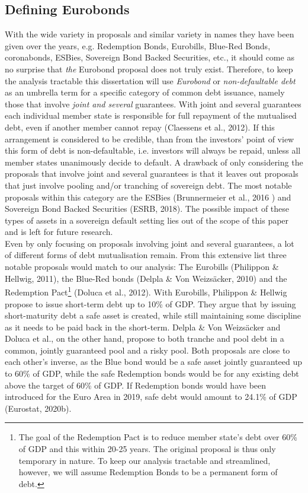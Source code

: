 \subsection{Defining Eurobonds}
With the wide variety in proposals and similar variety in names they have been given over the years, e.g. Redemption Bonds, Eurobills, Blue-Red Bonds, coronabonds, ESBies, Sovereign Bond Backed Securities, etc., it should come as no surprise that \textit{the} Eurobond proposal does not truly exist. Therefore, to keep the analysis tractable this dissertation will use \textit{Eurobond} or \textit{non-defaultable debt} as an umbrella term for a specific category of common debt issuance, namely those that involve \textit{joint and several} guarantees. With joint and several guarantees each individual member state is responsible for full repayment of the mutualised debt, even if another member cannot repay (Claessens et al., 2012).  If this arrangement is considered to be credible, than from the investors' point of view this form of debt is non-defaultable, i.e. investors will always be repaid, unless all member states unanimously decide to default. A drawback of only considering the proposals that involve joint and several guarantees is that it leaves out proposals that just involve pooling and/or tranching of sovereign debt. The most notable proposals within this category are the ESBies (Brunnermeier et al., 2016 ) and Sovereign Bond Backed Securities (ESRB, 2018). The possible impact of these types of assets in a sovereign default setting lies out of the scope of this paper and is left for future research.\\

Even by only focusing on proposals involving joint and several guarantees, a lot of different forms of debt mutualisation remain. From this extensive list three notable proposals would match to our analysis: The Eurobills (Philippon \& Hellwig, 2011), the Blue-Red bonds (Delpla \& Von Weizsäcker, 2010) and the Redemption Pact\footnote{The goal of the Redemption Pact is to reduce member state's debt over 60\% of GDP and this within 20-25 years. The original proposal is thus only temporary in nature. To keep our analysis tractable and streamlined, however, we will assume Redemption Bonds to be a permanent form of debt.} (Doluca et al., 2012). With Eurobills, Philippon \& Hellwig propose to issue short-term debt up to 10\% of GDP. They argue that by issuing short-maturity debt a safe asset is created, while still maintaining some discipline as it needs to be paid back in the short-term. Delpla \& Von Weizsäcker and Doluca et al., on the other hand, propose to both tranche and pool debt in a common, jointly guaranteed pool and a risky pool. Both proposals are close to each other's inverse, as the Blue bond would be a safe asset jointly guaranteed up to 60\% of GDP, while the safe Redemption bonds would be for any existing debt above the target of 60\% of GDP. If Redemption bonds would have been introduced for the Euro Area in 2019, safe debt would amount to 24.1\% of GDP (Eurostat, 2020b).\\

